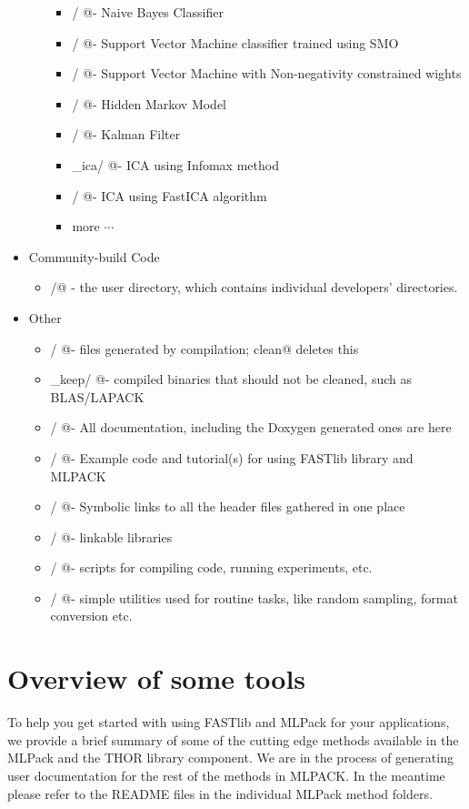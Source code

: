 \documentclass[letter]{report}
\begin{document}
\begin{itemize}
\begin{itemize}
\begin{itemize}
      \item \verb@nbc/         @- Naive Bayes Classifier
      \item \verb@svm/         @- Support Vector Machine classifier trained using SMO
      \item \verb@nnsvm/       @- Support Vector Machine with Non-negativity constrained wights
      \item \verb@hmm/         @- Hidden Markov Model
      \item \verb@kalman/      @- Kalman Filter
      \item \verb@infomax_ica/ @- ICA using Infomax method
      \item \verb@fastica/     @- ICA using FastICA algorithm 
      \item more $\cdots$
    \end{itemize}
  \end{itemize}
\item Community-build Code
  \begin {itemize}
  \item \verb@contrib/@ - the user directory, which contains individual developers' directories. 
\end {itemize} 
\item  Other
  \begin {itemize}
  \item \verb@bin/      @- files generated by compilation; \verb@make clean@ deletes this
  \item \verb@bin_keep/ @- compiled binaries that should not be cleaned, such as BLAS/LAPACK
  \item \verb@doc/      @- All documentation, including the Doxygen generated ones are here
  \item \verb@examples/ @- Example code and tutorial(s) for using FASTlib library and MLPACK
  \item \verb@include/  @- Symbolic links to all the header files gathered in one place
  \item \verb@lib/      @- linkable libraries
  \item \verb@script/   @- scripts for compiling code, running experiments, etc.
  \item \verb@util/     @- simple utilities used for routine tasks, like random sampling, format conversion etc.
  \end {itemize}
\end{itemize}

\section{Overview of some tools}
To help you get started with using FASTlib and MLPack for your applications, we provide a brief summary of some of the cutting edge methods available in the MLPack and the THOR library component. We are in the process of generating user documentation for the rest of the methods in MLPACK. In the meantime please refer to the README files in the individual MLPack method folders.
\end{document}

